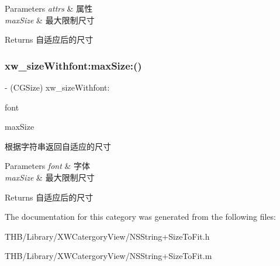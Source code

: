 \begin{DoxyParams}{Parameters}
{\em attrs} & 属性 \\
\hline
{\em max\+Size} & 最大限制尺寸\\
\hline
\end{DoxyParams}
\begin{DoxyReturn}{Returns}
自适应后的尺寸 
\end{DoxyReturn}
\mbox{\label{category_n_s_string_07_size_to_fit_08_a5d0f332e39de72b491d7899d32eafcb8}} 
\subsubsection{\texorpdfstring{xw\+\_\+size\+Withfont\+:max\+Size\+:()}{xw\_sizeWithfont:maxSize:()}}
{\footnotesize\ttfamily -\/ (C\+G\+Size) xw\+\_\+size\+Withfont\+: \begin{DoxyParamCaption}\item[{(U\+I\+Font $\ast$)}]{font }\item[{maxSize:(C\+G\+Size)}]{max\+Size }\end{DoxyParamCaption}}

根据字符串返回自适应的尺寸


\begin{DoxyParams}{Parameters}
{\em font} & 字体 \\
\hline
{\em max\+Size} & 最大限制尺寸\\
\hline
\end{DoxyParams}
\begin{DoxyReturn}{Returns}
自适应后的尺寸 
\end{DoxyReturn}


The documentation for this category was generated from the following files\+:\begin{DoxyCompactItemize}
\item 
T\+H\+B/\+Library/\+X\+W\+Catergory\+View/N\+S\+String+\+Size\+To\+Fit.\+h\item 
T\+H\+B/\+Library/\+X\+W\+Catergory\+View/N\+S\+String+\+Size\+To\+Fit.\+m\end{DoxyCompactItemize}
